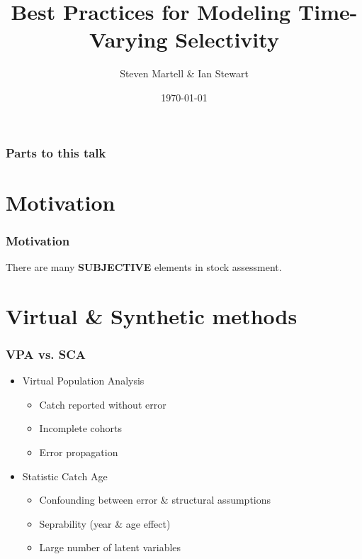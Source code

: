 \documentclass[table]{beamer}
\title[IPHC]{Best Practices for Modeling Time-Varying Selectivity}
\author[Martell \& Stewart]{Steven Martell \& Ian Stewart}
\institute[IPHC]
{
International Pacific Halibut Commission\\
\medskip
{\emph{stevem@iphc.int}}
}
\date{\today}
\begin{document}
%
\begin{frame}
\titlepage
\end{frame}
%
\begin{frame}[t]\frametitle{Parts to this talk}
    
\tableofcontents

\end{frame}

\section{Motivation} %
\label{sec:motivation}

\begin{frame}
\frametitle{Motivation}

	
\begin{center}
	There are many \textbf{SUBJECTIVE} elements in stock assessment.
\end{center}

\end{frame}

\section{Virtual \& Synthetic methods} %
\label{sec:virtual_&_synthetic_methods}

\begin{frame}[m]\frametitle{VPA vs. SCA}

\begin{itemize}

	\item \alert<1>{Virtual Population Analysis}
		\begin{itemize}[<+->]
			\item Catch reported without error
			\item Incomplete cohorts
			\item Error propagation
		\end{itemize}
\vfill
	\item \alert<4>{Statistic Catch Age }
		\begin{itemize}[<+->]
			\item Confounding between error \& structural assumptions
			\item Seprability (year \& age effect)
			\item Large number of latent variables
		\end{itemize}
\end{itemize}
    


\end{frame}
\end{document}
